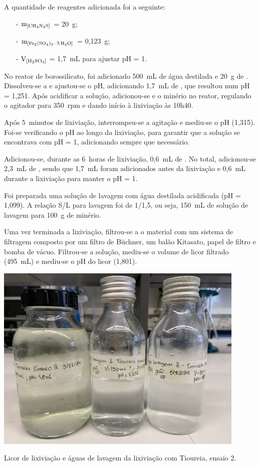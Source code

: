 A quantidade de reagentes adicionada foi a seguinte:
\begin{itemize}
    \item[-] $\mathrm{m}_{\left[\tioureia{}\right]}$ = 20~g;
    \item[-] $\mathrm{m}_{\left[\sulfe{}\right]}$ = 0,123~g;
    \item[-] $\mathrm{V}_{\left[\acsul{}\right]}$ = 1,7~mL para ajustar pH = 1.
\end{itemize}

No reator de borossilicato, foi adicionado 500~mL de água destilada e 20~g de \tioureia{}. 
Dissolveu-se a \tioureia{} e ajustou-se o pH, adicionando 1,7~mL de \acsul{}, que resultou num pH = 1,251.
Após acidificar a solução, adicionou-se \sulfe{} e o minério no reator, regulando o agitador para 350~rpm e dando início à lixiviação às 10h40.

Após 5~minutos de lixiviação, interrompeu-se a agitação e mediu-se o pH (1,315). 
Foi-se verificando o pH ao longo da lixiviação, para garantir que a solução se encontrava com pH = 1, adicionando \acsul{} sempre que necessário.

Adicionou-se, durante as 6~horas de lixiviação, 0,6~mL de \acsul{}. No total, adicionou-se 2,3~mL de \acsul{}, sendo que 1,7~mL foram adicionados antes da lixiviação e 0,6~mL durante a lixiviação para manter o pH = 1.

Foi preparada uma solução de lavagem com água destilada acidificada (pH = 1,099). 
A relação S/L para lavagem foi de 1/1,5, ou seja, 150~mL de solução de lavagem para 100~g de minério.

Uma vez terminada a lixiviação, filtrou-se a o material com um sistema de filtragem composto por um filtro de Büchner, um balão Kitasato, papel de filtro e bomba de vácuo.
Filtrou-se a solução, mediu-se o volume de licor filtrado (495~mL) e mediu-se o pH do licor (1,801).

\begin{marginfigure}
    \centering
    \includegraphics[width=0.9\textwidth]{figures/Licores de lixiviação - tioureia ensaio 2}
    \caption{Licor de lixiviação e águas de lavagem da lixiviação com Tioureia, ensaio 2.}
    \label{fig:licores-lixiviacao-tioureia-ensaio2}
\end{marginfigure}

